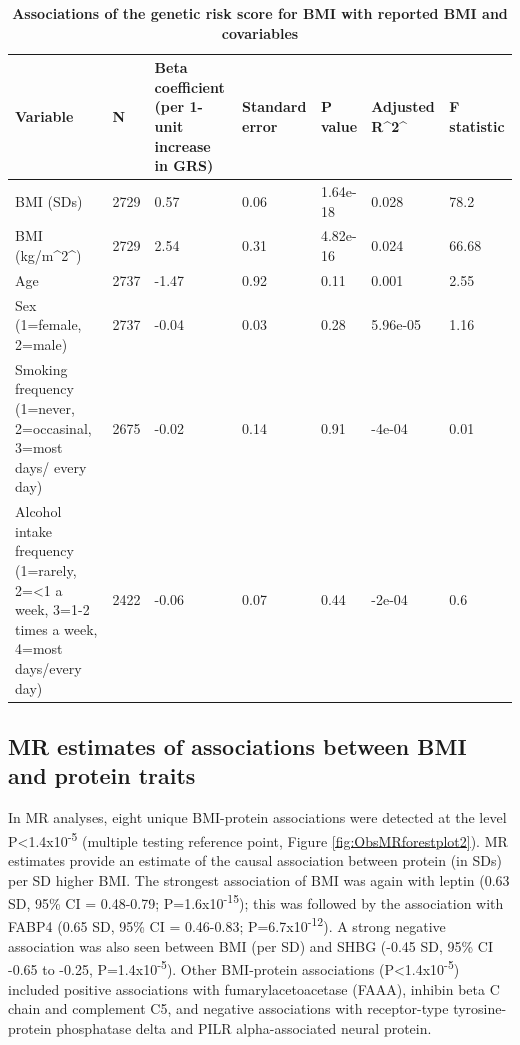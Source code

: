 \documentclass[11pt,twoside]{bristolthesis}
\begin{document}
\begin{landscape}\begin{table}

\caption[Associations of the genetic risk score for BMI with reported BMI and covariables]{\label{tab:INT-GRS-confounders}\textbf{Associations of the genetic risk score for BMI with reported BMI and covariables}}
\centering
\begin{tabu} to 
\toprule
Variable & N & Beta coefficient (per 1-unit increase in GRS) & Standard error & P value & Adjusted R\textasciicircum{}2\textasciicircum{} & F statistic\\
\midrule
BMI (SDs) & 2729 & 0.57 & 0.06 & 1.64e-18 & 0.028 & 78.2\\
BMI (kg/m\textasciicircum{}2\textasciicircum{}) & 2729 & 2.54 & 0.31 & 4.82e-16 & 0.024 & 66.68\\
Age & 2737 & -1.47 & 0.92 & 0.11 & 0.001 & 2.55\\
Sex (1=female, 2=male) & 2737 & -0.04 & 0.03 & 0.28 & 5.96e-05 & 1.16\\
Smoking frequency (1=never, 2=occasinal, 3=most days/ every day) & 2675 & -0.02 & 0.14 & 0.91 & -4e-04 & 0.01\\
\addlinespace
Alcohol intake frequency (1=rarely, 2=<1 a week, 3=1-2 times a week, 4=most days/every day) & 2422 & -0.06 & 0.07 & 0.44 & -2e-04 & 0.6\\
\bottomrule
\end{tabu}
\end{table}
\end{landscape}
\hypertarget{mr-estimates-of-associations-between-bmi-and-protein-traits}{%
\subsection{MR estimates of associations between BMI and protein traits}\label{mr-estimates-of-associations-between-bmi-and-protein-traits}}

In MR analyses, eight unique BMI-protein associations were detected at the level P\textless1.4x10\textsuperscript{-5} (multiple testing reference point, Figure \ref{fig:ObsMRforestplot2}). MR estimates provide an estimate of the causal association between protein (in SDs) per SD higher BMI. The strongest association of BMI was again with leptin (0.63 SD, 95\% CI = 0.48-0.79; P=1.6x10\textsuperscript{-15}); this was followed by the association with FABP4 (0.65 SD, 95\% CI = 0.46-0.83; P=6.7x10\textsuperscript{-12}). A strong negative association was also seen between BMI (per SD) and SHBG (-0.45 SD, 95\% CI -0.65 to -0.25, P=1.4x10\textsuperscript{-5}). Other BMI-protein associations (P\textless1.4x10\textsuperscript{-5}) included positive associations with fumarylacetoacetase (FAAA), inhibin beta C chain and complement C5, and negative associations with receptor-type tyrosine-protein phosphatase delta and PILR alpha-associated neural protein.
\end{document}
